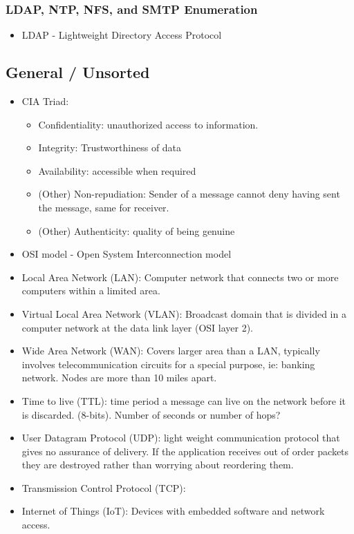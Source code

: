 \subsubsection{LDAP, NTP, NFS, and SMTP Enumeration}
\begin{itemize}
    \item LDAP - Lightweight Directory Access Protocol
\end{itemize}

\subsection{General / Unsorted}
\begin{itemize}
    \item CIA Triad:
    \begin{itemize}
        \item Confidentiality: unauthorized access to information.
        \item Integrity: Trustworthiness of data
        \item Availability: accessible when required
        \item (Other) Non-repudiation: Sender of a message cannot deny having sent the message, same for receiver.
        \item (Other) Authenticity: quality of being genuine
    \end{itemize}
    \item OSI model - Open System Interconnection model
    \item Local Area Network (LAN): Computer network that connects two or more computers within a limited area.
    \item Virtual Local Area Network (VLAN): Broadcast domain that is divided in a computer network at the data link layer (OSI layer 2).
    \item Wide Area Network (WAN): Covers larger area than a LAN, typically involves telecommunication circuits for a special purpose, ie: banking network. Nodes are more than 10 miles apart.
    \item Time to live (TTL): time period a message can live on the network before it is discarded. (8-bits). Number of seconds or number of hops?
    \item User Datagram Protocol (UDP): light weight communication protocol that gives no assurance of delivery.
    If the application receives out of order packets they are destroyed rather than worrying about reordering them.
    \item Transmission Control Protocol (TCP):
    \item Internet of Things (IoT): Devices with embedded software and network access.
   

\end{itemize}
